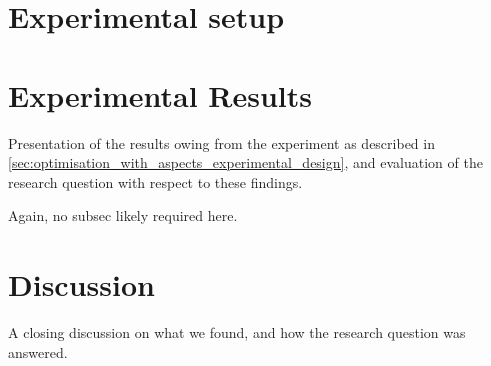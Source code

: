 


\section{Experimental setup}



\section{Experimental Results}\label{sec:optimisation_with_aspects_experimental_results}

Presentation of the results owing from the experiment as described in
\cref{sec:optimisation_with_aspects_experimental_design}, and evaluation of the
research question with respect to these findings.

Again, no subsec likely required here.

\section{Discussion}\label{sec:optimisation_with_aspects_discussion}

A closing discussion on what we found, and how the research question was
answered.